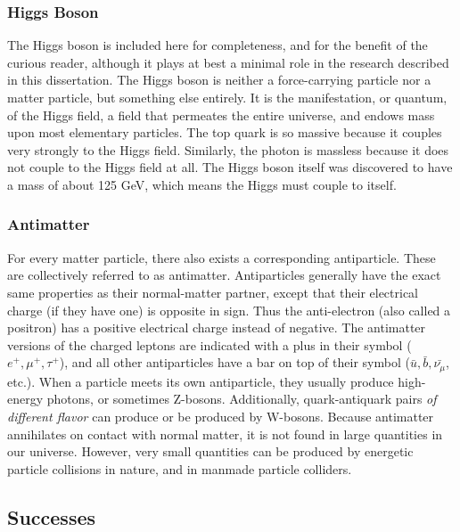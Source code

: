 \subsubsection*{Higgs Boson}
The Higgs boson is included here for completeness, and for the benefit
of the curious reader, although it plays at best a minimal
role in the research described in this dissertation. The Higgs
boson is neither a force-carrying particle nor a matter particle, but
something else entirely. It is the manifestation, or quantum, of the
Higgs field, a field that permeates the entire universe, and endows
mass upon most elementary particles. The top quark is so massive
because it couples very strongly to the Higgs field. Similarly, the
photon is massless because it does not couple to the Higgs field at all.
The Higgs boson itself was discovered to have a mass of about 125 GeV,
which means the Higgs must couple to itself.

\subsubsection*{Antimatter}
For every matter particle, there also exists a corresponding
antiparticle. These are collectively referred to as
antimatter. Antiparticles generally have the exact same properties as
their normal-matter partner, except that their electrical charge (if
they have one) is opposite in sign. Thus the anti-electron (also
called a positron) has a positive electrical charge instead of
negative. The antimatter versions of the charged leptons are indicated
with a plus in their symbol ($e^+, \mu^+, \tau^+$), and all other
antiparticles have a bar on top of their symbol ($\bar{u},
\bar{b}, \bar{\nu_{\mu}}$, etc.). When a particle meets its own
antiparticle, they usually produce high-energy photons, or sometimes
Z-bosons. Additionally, quark-antiquark pairs \emph{of different
  flavor} can produce or be produced by W-bosons. Because antimatter
annihilates on contact with normal matter, it is not found
in large quantities in our universe. However, very small quantities can be
produced by energetic particle collisions in nature, and in manmade
particle colliders.


\subsection{Successes}
\label{ssec:SMsuccesses}

